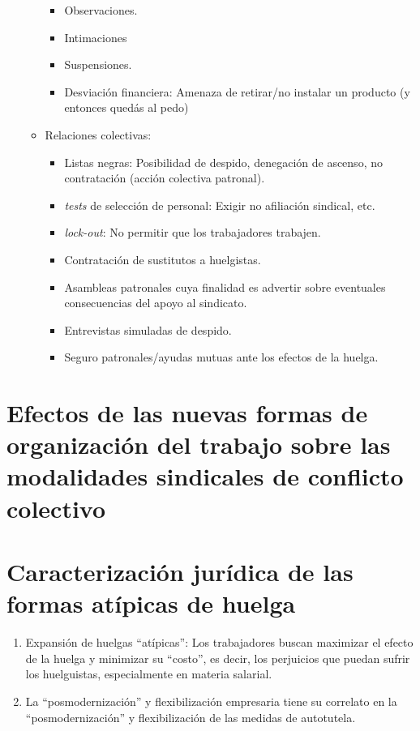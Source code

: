 \documentclass[spanish,12pt,a4paper,titlepage]{report}
\begin{document}
\begin{itemize}
\begin{itemize}
    \begin{itemize}
    \item Observaciones.
    \item Intimaciones
    \item Suspensiones.
    \item Desviación financiera: Amenaza de retirar/no instalar un producto (y entonces quedás al pedo)
    \end{itemize}
  \item Relaciones colectivas:
    \begin{itemize}
    \item Listas negras: Posibilidad de despido, denegación de ascenso, no contratación (acción colectiva patronal).
    \item \textit{tests} de selección de personal: Exigir no afiliación sindical, etc. 
    \item \textit{lock-out}: No permitir que los trabajadores trabajen.
    \item Contratación de sustitutos a huelgistas.
    \item Asambleas patronales cuya finalidad es advertir sobre eventuales consecuencias del apoyo al sindicato.
    \item Entrevistas simuladas de despido.
    \item Seguro patronales/ayudas mutuas ante los efectos de la huelga.
    \end{itemize}
  \end{itemize}
\end{itemize}

\section{Efectos de las nuevas formas de organización del trabajo sobre las modalidades sindicales de conflicto colectivo}
\label{sec:Efectos-de-las-nuevas-formas-de-organizacion-del-trabajo-sobre-las-modalidades-sindicales-de-conflicto-colectivo}



\section{Caracterización jurídica de las formas atípicas de huelga}
\label{sec:Caracterizacion-juridica-de-las-formas-atipicas-de-huelga}

\begin{enumerate}
\item Expansión de huelgas ``atípicas'': Los trabajadores buscan maximizar el efecto de la huelga y minimizar su ``costo'', es decir, los perjuicios que puedan sufrir los huelguistas, especialmente en materia salarial.
\item La ``posmodernización'' y flexibilización empresaria tiene su correlato en la ``posmodernización'' y flexibilización de las medidas de autotutela. 
\end{enumerate}
\end{document}
